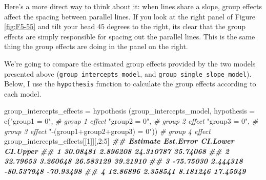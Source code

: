 \documentclass[
]{book}
\newenvironment{Shaded}{\begin{snugshade}}{\end{snugshade}}
\newcommand{\AttributeTok}[1]{\textcolor[rgb]{0.77,0.63,0.00}{#1}}
\newcommand{\CommentTok}[1]{\textcolor[rgb]{0.56,0.35,0.01}{\textit{#1}}}
\newcommand{\DecValTok}[1]{\textcolor[rgb]{0.00,0.00,0.81}{#1}}
\newcommand{\DocumentationTok}[1]{\textcolor[rgb]{0.56,0.35,0.01}{\textbf{\textit{#1}}}}
\newcommand{\FunctionTok}[1]{\textcolor[rgb]{0.00,0.00,0.00}{#1}}
\newcommand{\NormalTok}[1]{#1}
\newcommand{\OtherTok}[1]{\textcolor[rgb]{0.56,0.35,0.01}{#1}}
\newcommand{\SpecialCharTok}[1]{\textcolor[rgb]{0.00,0.00,0.00}{#1}}
\newcommand{\StringTok}[1]{\textcolor[rgb]{0.31,0.60,0.02}{#1}}
\begin{document}
Here's a more direct way to think about it: when lines share a slope, group effects affect the spacing between parallel lines. If you look at the right panel of Figure \ref{fig:F5-55} and tilt your head 45 degrees to the right, its clear that the group effects are simply responsible for spacing out the parallel lines. This is the same thing the group effects are doing in the panel on the right.

We're going to compare the estimated group effects provided by the two models presented above (\texttt{group\_intercepts\_model}, and \texttt{group\_single\_slope\_model}). Below, I use the \texttt{hypothesis} function to calculate the group effects according to each model.

\begin{Shaded}
\begin{Highlighting}[]
\NormalTok{group\_intercepts\_effects }\OtherTok{=} 
  \FunctionTok{hypothesis}\NormalTok{ (group\_intercepts\_model,}
              \AttributeTok{hypothesis =} \FunctionTok{c}\NormalTok{(}\StringTok{"group1 = 0"}\NormalTok{, }\CommentTok{\# group 1 effect}
                             \StringTok{"group2 = 0"}\NormalTok{, }\CommentTok{\# group 2 effect}
                             \StringTok{"group3 = 0"}\NormalTok{, }\CommentTok{\# group 3 effect}
                             \StringTok{"{-}(group1+group2+group3) = 0"}\NormalTok{)) }\CommentTok{\# group 4 effect   }
\NormalTok{group\_intercepts\_effects[[}\DecValTok{1}\NormalTok{]][,}\DecValTok{2}\SpecialCharTok{:}\DecValTok{5}\NormalTok{]}
\DocumentationTok{\#\#    Estimate Est.Error   CI.Lower  CI.Upper}
\DocumentationTok{\#\# 1  30.08481  2.896208  24.310787  35.74068}
\DocumentationTok{\#\# 2  32.79653  3.260648  26.583129  39.21910}
\DocumentationTok{\#\# 3 {-}75.75030  2.444318 {-}80.537948 {-}70.93498}
\DocumentationTok{\#\# 4  12.86896  2.358541   8.181246  17.45949}
\end{Highlighting}
\end{Shaded}
\end{document}
